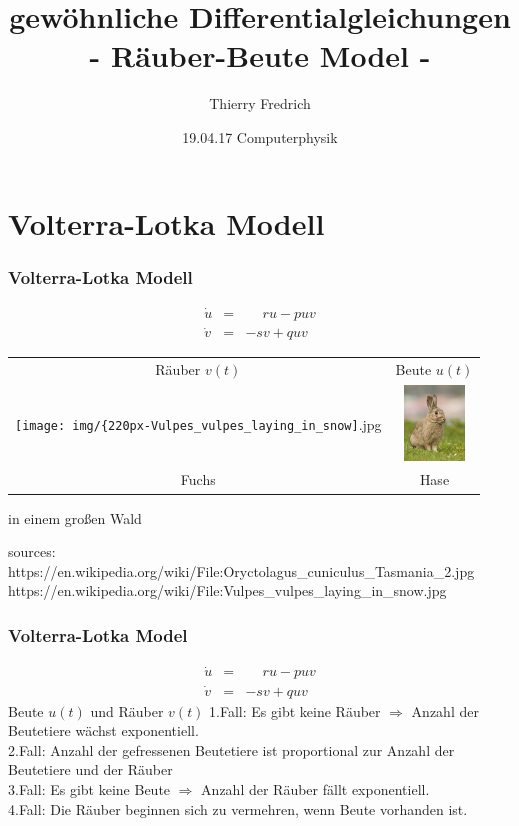 \documentclass{beamer}
\title[Räuber-Beute Model]{gewöhnliche Differentialgleichungen\\- Räuber-Beute Model -}
\author[T. Fredrich]{Thierry Fredrich}
\institute[Uni Saarland]{Saarland University}
\date[19.04.17]{19.04.17 Computerphysik}
\begin{document}
\frame{\titlepage}

\section{Volterra-Lotka Modell}
\frame
{
  \frametitle{Volterra-Lotka Modell}
\begin{eqnarray}
 \dot u &=& \phantom{-} r u - p u v\nonumber\\
 \dot v &=& - s v + q u v \nonumber
\end{eqnarray}

\begin{center}
\begin{tabular}{cc}
 Räuber $v(t)$ & Beute $u(t)$\\ 
 \texttt{[image: img/\{220px-Vulpes\_vulpes\_laying\_in\_snow]}.jpg} & \includegraphics[height=2cm]{img/Oryctolagus_cuniculus_Tasmania_2.jpg}\\ 
 Fuchs & Hase 
\end{tabular}
\end{center}
\begin{flushright}
 in einem großen Wald
\end{flushright}
\scriptsize{sources:\\}
\scriptsize{https://en.wikipedia.org/wiki/File:Oryctolagus\_cuniculus\_Tasmania\_2.jpg}
\scriptsize{https://en.wikipedia.org/wiki/File:Vulpes\_vulpes\_laying\_in\_snow.jpg}

}


\frame
{
  \frametitle{Volterra-Lotka Model}
\begin{eqnarray}
 \dot u &=& \phantom{-} r u - p u v\nonumber\\
 \dot v &=& - s v + q u v \nonumber
\end{eqnarray}
Beute $u(t)$ und Räuber $v(t)$\newline\newline
1.Fall: Es gibt keine Räuber $\Rightarrow$ Anzahl der Beutetiere wächst exponentiell.\\
2.Fall: Anzahl der gefressenen Beutetiere ist proportional zur Anzahl der Beutetiere und der Räuber\\
3.Fall: Es gibt keine Beute $\Rightarrow$ Anzahl der Räuber fällt exponentiell.\\
4.Fall: Die Räuber beginnen sich zu vermehren, wenn Beute vorhanden ist.
}
\end{document}
